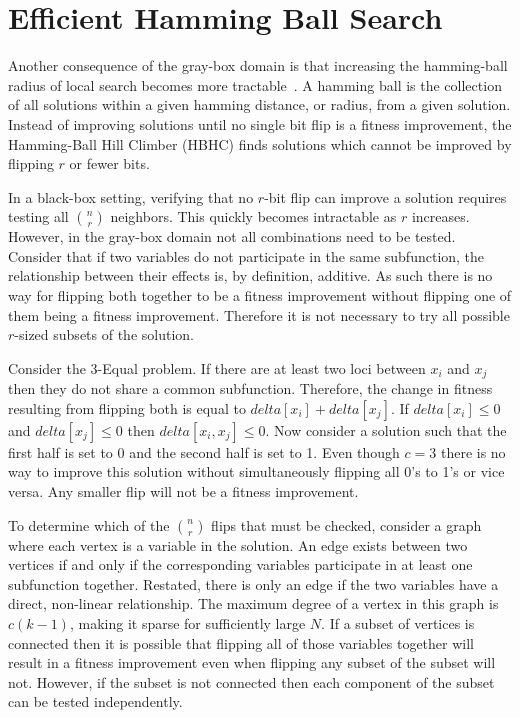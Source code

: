 \section{Efficient Hamming Ball Search}
\label{sec-hamming}
Another consequence of the gray-box domain is that increasing the hamming-ball radius of local search becomes
more tractable~\cite{chicano:2014:ball}.
A hamming ball is the collection of all solutions
within a given hamming distance, or radius, from a given solution.
Instead of improving solutions until no single bit flip
is a fitness improvement, the Hamming-Ball Hill Climber (HBHC) finds solutions which
cannot be improved by flipping $r$ or fewer bits.

In a black-box setting, verifying that no $r$-bit flip can improve a solution requires testing all
$n \choose r$ neighbors. This quickly becomes intractable as $r$
increases. However,
in the gray-box
domain not all combinations need to be tested. Consider that if two variables do not participate
in the same subfunction, the relationship between their effects is,
by definition,
additive. As such
there is no way for flipping both together to be a fitness improvement without flipping one of them
being a fitness improvement. Therefore it is not necessary to try all possible $r$-sized subsets
of the solution.

Consider the 3-Equal problem.  If there are at least two loci between
$x_i$ and $x_j$ 
then
they do
not share a common subfunction. Therefore, the change in fitness resulting from flipping
both is equal to $delta[x_i] + delta[x_j]$. 
If $delta[x_i] \leq 0$ and $delta[x_j] \leq 0$
then $delta[x_i,x_j] \leq 0$. Now consider a solution such that the first half is set to 0
and the second half is set to 1. Even though $c=3$ there is no way to improve this solution without
simultaneously flipping all 0's to 1's or vice versa. Any smaller flip will not
be a fitness improvement.

To determine which of the $n \choose r$ flips that must be checked, consider a graph where
each vertex is a variable in the solution. An edge exists between two vertices if and only
if the corresponding variables participate in at least one subfunction together. Restated,
there is only an edge if the two variables have a direct,
non-linear relationship. The maximum
degree of a vertex in this graph is $c(k-1)$, making it sparse for sufficiently large $N$.
If a subset of vertices is connected then it is possible that flipping all of those
variables together will result in a fitness improvement even when flipping any subset
of the subset will not. However, if the subset is not connected then each component
of the subset can be tested independently.

